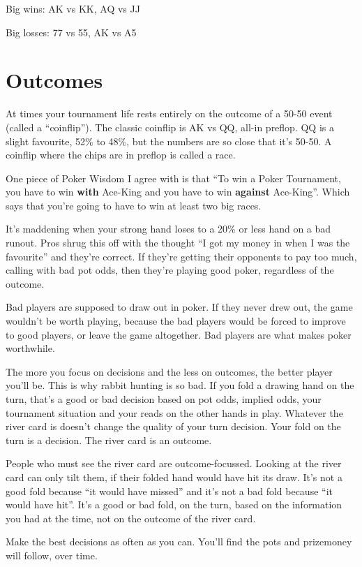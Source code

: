 Big wins: AK vs KK, AQ vs JJ 

Big losses: 77 vs 55, AK vs A5

\section{Outcomes}

At times your tournament life rests entirely on the outcome of
a 50-50 event (called a ``coinflip'').
The classic coinflip is AK vs QQ, all-in preflop. QQ is a slight
favourite, 52\% to 48\%, but the numbers are so close that it's 50-50.
A coinflip where the chips are in preflop is called a race.

One piece of Poker Wisdom I agree with is that ``To win a
Poker Tournament, you have to win \textbf{with} Ace-King and
you have to win \textbf{against} Ace-King''. Which says that you're
going to have to win at least two big races.

It's maddening when your strong hand loses to a 20\% or less
hand on a bad runout. Pros shrug this off with
the thought ``I got my money in when I was the favourite'' and they're
correct. If they're getting their opponents to pay too much, calling
with bad pot odds, then they're playing good poker, regardless of
the outcome.

Bad players are supposed to draw out in poker. If they never drew
out, the game wouldn't be worth playing, because the bad players
would be forced to improve to good players, or leave the game
altogether. Bad players are what makes poker worthwhile.

The more you focus on decisions and the less on outcomes, the
better player you'll be. This is why rabbit hunting is so bad. If
you fold a drawing hand on the turn, that's a good or bad decision
based on pot odds, implied odds, your tournament situation
and your reads on the other hands in play. Whatever the river card is
doesn't change the quality of your turn decision. Your fold on the
turn is a decision. The river card is an outcome.

People who must see the river card are outcome-focussed. Looking
at the river card can only tilt them, if their folded hand would
have hit its draw. It's not a good fold because ``it would have
missed'' and it's not a bad fold because ``it would have hit''. It's
a good or bad fold, on the turn, based on the information you
had at the time, not on the outcome of the river card.


Make the best decisions as often as you can. You'll find the pots
and prizemoney will follow, over time.
